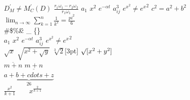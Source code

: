 \documentclass[a4paper,12pt]{article}
\newcommand{\wuhao}{\fontsize{10.5pt}{20pt}\selectfont}%
\begin{document}
\begin{multicols}{2}
$D^\prime_M\neq M^\prime_C(D)$
$\frac{r_{1}\omega_{1}-r_{2}\omega_{2}}{r_{1}\omega_{1}}$
$a_{1}$ \qquad $x^{2}$\qquad
$e^{-\alpha t}$ \qquad
$a^{3}_{ij}$
$e^{x^2} \neq {e^x}^2$
\newpage
$c^{2}=a^{2}+b^{2}$\\
$\lim_{n \to \infty}
\sum_{k=1}^n \frac{1}{k^2}
=\frac{pi^2}{6}$\\
\#\$\%\^ \& \_ \{\}\~\\
$a_{1}$ \qquad $x^{2}$\qquad
$e^{-\alpha t}$ \qquad
$a^{3}_{ij}$
$e^{x^2} \neq {e^x}^2$\\
$\sqrt{x}$ \qquad
$\sqrt{ x^{2}+\sqrt{y} }$
\qquad $\sqrt[3]{2}$[3pt]
$\surd[x^2 + y^2]$\\
$\overline{m+n}$ \qquad
$\underline{m+n}$\\
$\underbrace{ a+b+cdots+z }_{26}$\\
$\frac{ x^{2} }{ k+1 }\qquad
x^{ \frac{2}{k+1} }\qquad$










\end{multicols}
\end{document}
